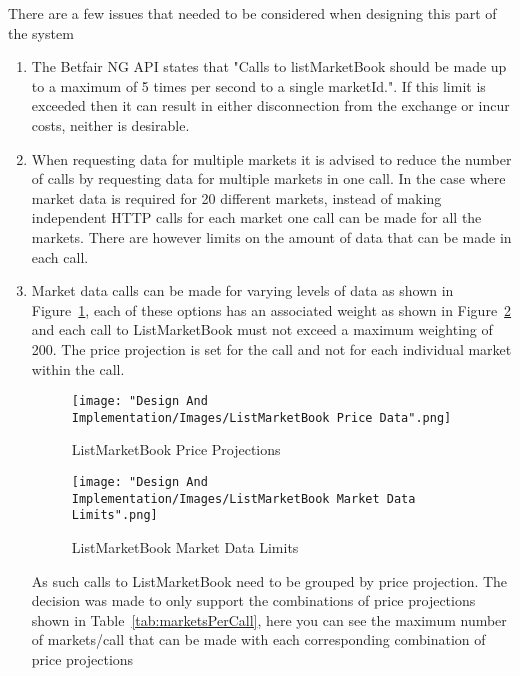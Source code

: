 			There are a few issues that needed to be considered when designing this part of the system
			\begin{enumerate}
				\item The Betfair NG API states that "Calls to listMarketBook should be made up to a maximum of 5 times per second to a single marketId."\cite{ListMarketBook}. If this limit is exceeded then it can result in either disconnection from the exchange or incur costs, neither is desirable.
				\item When requesting data for multiple markets it is advised to reduce the number of calls by requesting data for multiple markets in one call. In the case where market data is required for 20 different markets, instead of making independent HTTP calls for each market one call can be made for all the markets. There are however limits on the amount of data that can be made in each call.
				
				\item Market data calls can be made for varying levels of data as shown in Figure~\ref{fig:listmMarketBookPriceProjections}, each of these options has an associated weight as shown in Figure~\ref{fig:listmMarketBookDataLimits} and each call to ListMarketBook must not exceed a maximum weighting of 200. The price projection is set for the call and not for each individual market within the call. 
				
						\begin{figure}[H]
							\texttt{[image: "Design And Implementation/Images/ListMarketBook Price Data".png]}
							\centering
							\caption{ListMarketBook Price Projections}
    							\label{fig:listmMarketBookPriceProjections}
						\end{figure}

						\begin{figure}[H]
							\texttt{[image: "Design And Implementation/Images/ListMarketBook Market Data Limits".png]}
							\centering
							\caption{ListMarketBook Market Data Limits}
    							\label{fig:listmMarketBookDataLimits}
						\end{figure}

				As such calls to ListMarketBook need to be grouped by price projection. The decision was made to only support the combinations of price projections shown in Table~\ref{tab:marketsPerCall}, here you can see the maximum number of markets/call that can be made with each corresponding combination of price projections
		

\end{enumerate}
